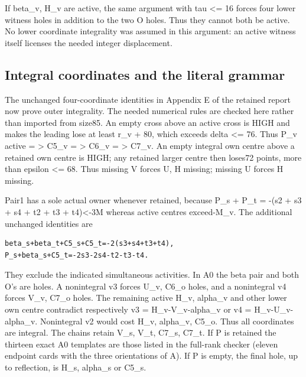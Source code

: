 \documentclass[11pt,a4paper]{article}
\begin{document}
If beta\_v, H\_v are active, the same argument with tau \textless= 16
forces four lower witness holes in addition to the two O holes. Thus
they cannot both be active. No lower coordinate integrality was assumed
in this argument: an active witness itself licenses the needed integer
displacement.

\hypertarget{integral-coordinates-and-the-literal-grammar}{%
\subsection{Integral coordinates and the literal
grammar}\label{integral-coordinates-and-the-literal-grammar}}

The unchanged four-coordinate identities in Appendix E of the retained
report now prove outer integrality. The needed numerical rules are
checked here rather than imported from size85. An empty cross above an
active cross is HIGH and makes the leading lose at least r\_v + 80,
which exceeds delta \textless= 76. Thus P\_v active = \textgreater{}
C5\_v = \textgreater{} C6\_v = \textgreater{} C7\_v. An empty integral
own centre above a retained own centre is HIGH; any retained larger
centre then loses72 points, more than epsilon \textless= 68. Thus
missing V forces U, H missing; missing U forces H missing.

Pair1 has a sole actual owner whenever retained, because P\_s + P\_t =
-(s2 + s3 + s4 + t2 + t3 + t4)\textless-3M whereas active centres
exceed-M\_v. The additional unchanged identities are

\begin{verbatim}
beta_s+beta_t+C5_s+C5_t=-2(s3+s4+t3+t4),
P_s+beta_s+C5_t=-2s3-2s4-t2-t3-t4.
\end{verbatim}

They exclude the indicated simultaneous activities. In A0 the beta pair
and both O's are holes. A nonintegral v3 forces U\_v, C6\_o holes, and a
nonintegral v4 forces V\_v, C7\_o holes. The remaining active H\_v,
alpha\_v and other lower own centre contradict respectively v3 =
H\_v-V\_v-alpha\_v or v4 = H\_v-U\_v-alpha\_v. Nonintegral v2 would cost
H\_v, alpha\_v, C5\_o. Thus all coordinates are integral. The chains
retain V\_s, V\_t, C7\_s, C7\_t. If P is retained the thirteen exact A0
templates are those listed in the full-rank checker (eleven endpoint
cards with the three orientations of A). If P is empty, the final hole,
up to reflection, is H\_s, alpha\_s or C5\_s.
\end{document}
